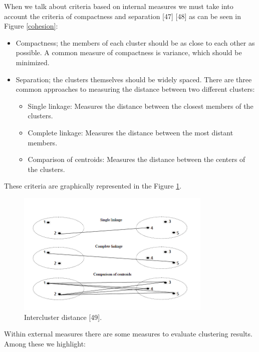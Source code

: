 \documentclass[
]{article}
\providecommand{\tightlist}{%
  \setlength{\itemsep}{0pt}\setlength{\parskip}{0pt}}
\begin{document}
When we talk about criteria based on internal measures we must take into
account the criteria of compactness and separation {[}47{]} {[}48{]} as
can be seen in Figure \ref{cohesion}:

\begin{itemize}
\tightlist
\item
  Compactness; the members of each cluster should be as close to each
  other as possible. A common measure of compactness is variance, which
  should be minimized.
\item
  Separation; the clusters themselves should be widely spaced. There are
  three common approaches to measuring the distance between two
  different clusters:

  \begin{itemize}
  \tightlist
  \item
    Single linkage: Measures the distance between the closest members of
    the clusters.
  \item
    Complete linkage: Measures the distance between the most distant
    members.
  \item
    Comparison of centroids: Measures the distance between the centers
    of the clusters.
  \end{itemize}
\end{itemize}

These criteria are graphically represented in the Figure
\ref{separation}.

\begin{figure}
\centering
\includegraphics[width=\textwidth,height=2.32292in]{img/separation.png}
\caption{Intercluster distance {[}49{]}. \label{separation}}
\end{figure}

Within external measures there are some measures to evaluate clustering
results. Among these we highlight:
\end{document}
